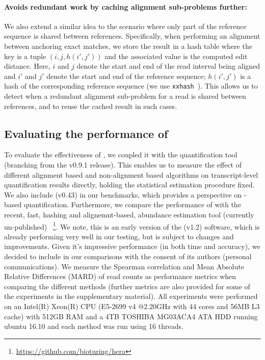 \paragraph{Avoids redundant work by caching alignment sub-problems further:} We also extend a similar idea to the 
scenario where only part of the reference sequence is shared between references.  Specifically, when performing an 
alignment between anchoring exact matches, we store the result in a hash table where the key is a tuple 
$\left(i,j,h\left(i', j'\right)\right)$ and the associated value is the computed edit distance.  Here, $i$ 
and $j$ denote the start and end of the read interval being aligned and $i'$ and $j'$ denote the start and 
end of the reference sequence; $h(i',j')$ is a hash of the corresponding reference sequence 
(we use \texttt{xxhash}~\citep{xxhash}).  This allows us to detect when a redundant alignment sub-problem for 
a read is shared between references, and to reuse the cached result in such cases.


\subsection{Evaluating the performance of \sla}


To evaluate the effectiveness of \sla, we coupled it with the quantification tool \salmon (branching from the v0.9.1 
release). This enables us to measure the effect of different alignment based and non-alignment based algorithms on 
transcript-level quantification results directly, holding the statistical estimation procedure fixed. We also include 
\kallisto(v0.43) in our benchmarks, which provides a perspective on \pa-based quantification. Furthermore, we compare 
the performance of \sla with the recent, fast, hashing and alignemnt-based, abundance estimation tool (currently un-published) 
\hera~\footnote{\url{https://github.com/bioturing/hera}}. We note, this is an early version of the \hera(v1.2) software, 
which is already performing very well in our testing, but is subject to changes and improvements. Given it's impressive 
performance (in both time and accuracy), we decided to include \hera in our comparisons with the consent of its authors 
(personal communications). We measure the Spearman correlation and Mean Absolute Relative Differences (MARD) of read 
counts as performance metrics when comparing the different methods (further metrics are also provided for some of the 
experiments in the supplementary material). All experiments were performed on an Intel(R) Xeon(R) CPU (E5-2699 v4 @2.20GHz 
with 44 cores and 56MB L3 cache) with 512GB RAM and a 4TB TOSHIBA MG03ACA4 ATA HDD running ubuntu 16.10 and each method 
was run using 16 threads.

